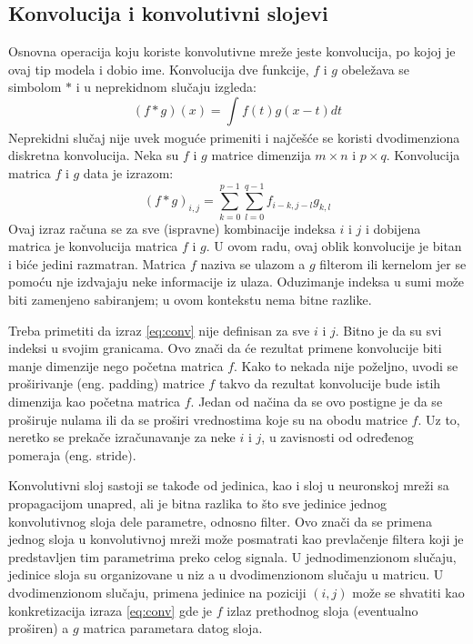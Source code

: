 \subsection{Konvolucija i konvolutivni slojevi} 
Osnovna operacija koju koriste konvolutivne mreže jeste konvolucija, po kojoj je ovaj tip modela i dobio ime. Konvolucija dve funkcije, $f$ i $g$ obeležava se simbolom $\ast$ i u neprekidnom slučaju izgleda:
\begin{equation}
	(f \ast g)(x) = \int_{}^{}f(t)g(x-t)dt 
\end{equation}
Neprekidni slučaj nije uvek moguće primeniti i najčešće se koristi dvodimenziona diskretna konvolucija. Neka su $f$ i $g$ matrice dimenzija $m\times n$ i $p \times q$. Konvolucija matrica $f$ i $g$ data je izrazom:
\begin{equation}
	\label{eq:conv}
	(f \ast g)_{i,j} = \sum_{k=0}^{p-1}\sum_{l=0}^{q-1} f_{i-k, j-l}g_{k,l}
\end{equation}
Ovaj izraz računa se za sve (ispravne) kombinacije indeksa $i$ i $j$ i dobijena matrica je konvolucija matrica $f$ i $g$.
U ovom radu, ovaj oblik konvolucije je bitan i biće jedini razmatran. Matrica $f$ naziva se ulazom a $g$ filterom ili kernelom jer se pomoću nje izdvajaju neke informacije iz ulaza. Oduzimanje indeksa u sumi može biti zamenjeno sabiranjem; u ovom kontekstu nema bitne razlike. 
\par 
Treba primetiti da izraz \eqref{eq:conv} nije definisan za sve $i$ i $j$. Bitno je da su svi indeksi u svojim granicama. Ovo znači da će rezultat primene konvolucije biti manje dimenzije nego početna matrica $f$. Kako to nekada nije poželjno, uvodi se proširivanje (eng. padding) matrice $f$ takvo da rezultat konvolucije bude istih dimenzija kao početna matrica $f$. Jedan od načina da se ovo postigne je da se proširuje nulama ili da se proširi vrednostima koje su na obodu matrice $f$. Uz to, neretko se prekače izračunavanje za neke $i$ i $j$, u zavisnosti od određenog pomeraja (eng. stride). 
\par 
Konvolutivni sloj sastoji se takođe od jedinica, kao i sloj u neuronskoj mreži sa propagacijom unapred, ali je bitna razlika to što sve jedinice jednog konvolutivnog sloja dele parametre, odnosno filter. Ovo znači da se primena jednog sloja u konvolutivnoj mreži može posmatrati kao prevlačenje filtera koji je predstavljen tim parametrima preko celog signala. U jednodimenzionom slučaju, jedinice sloja su organizovane u niz a u dvodimenzionom slučaju u matricu. U dvodimenzionom slučaju, primena jedinice na poziciji $(i,j)$ može se shvatiti kao konkretizacija izraza \eqref{eq:conv} gde je $f$ izlaz prethodnog sloja (eventualno proširen) a $g$ matrica parametara datog sloja. 

